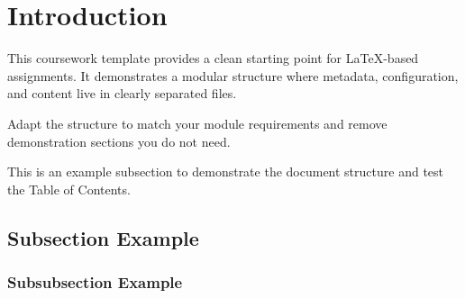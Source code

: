\section{Introduction}

This coursework template provides a clean starting point for LaTeX-based assignments. It demonstrates a modular structure where metadata, configuration, and content live in clearly separated files.

\begin{keypoint}
Adapt the structure to match your module requirements and remove demonstration sections you do not need.
\end{keypoint}

This is an example subsection to demonstrate the document structure and test the Table of Contents.

\subsection{Subsection Example}


\subsubsection{Subsubsection Example}

